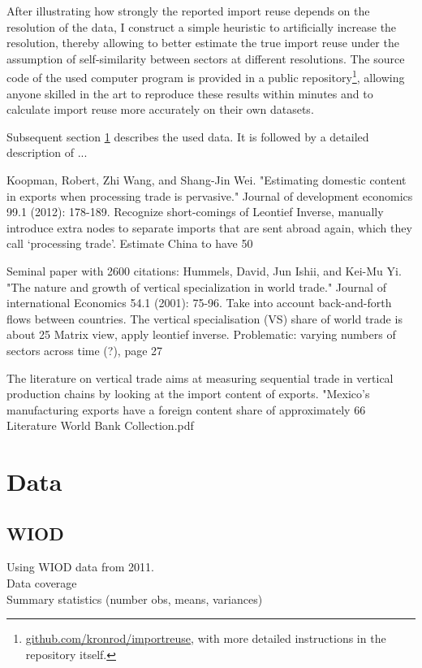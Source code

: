 \documentclass[english]{uzhpub}
\begin{document}
After illustrating how strongly the reported import reuse depends on the resolution of the data, I construct a simple heuristic to artificially increase the resolution, thereby allowing to better estimate the true import reuse under the assumption of self-similarity between sectors at different resolutions. The source code of the used computer program is provided in a public repository\footnote{\href{https://github.com/kronrod/importreuse}{github.com/kronrod/importreuse}, with more detailed instructions in the repository itself.}, allowing anyone skilled in the art to reproduce these results within minutes and to calculate import reuse more accurately on their own datasets.

Subsequent section \ref{sec:data} describes the used data. It is followed by a detailed description of ...


Koopman, Robert, Zhi Wang, and Shang-Jin Wei. "Estimating domestic content in exports when processing trade is pervasive." Journal of development economics 99.1 (2012): 178-189.
Recognize short-comings of Leontief Inverse, manually introduce extra nodes to separate imports that are sent abroad again, which they call ‘processing trade’. Estimate China to have 50%

Seminal paper with 2600 citations:
Hummels, David, Jun Ishii, and Kei-Mu Yi. "The nature and growth of vertical specialization in world trade." Journal of international Economics 54.1 (2001): 75-96.
Take into account back-and-forth flows between countries. The vertical specialisation (VS) share of world trade is about 25%
Matrix view, apply leontief inverse.
Problematic: varying numbers of sectors across time (?), page 27


The literature on vertical trade aims at measuring sequential trade in vertical production chains by looking at the import content of exports.
"Mexico’s manufacturing exports have a foreign content share of approximately 66%
Literature World Bank Collection.pdf



\section{Data}
\label{sec:data}
\subsection{WIOD}
Using WIOD data from 2011.\\
Data coverage\\
Summary statistics (number obs, means, variances)\\
\end{document}
